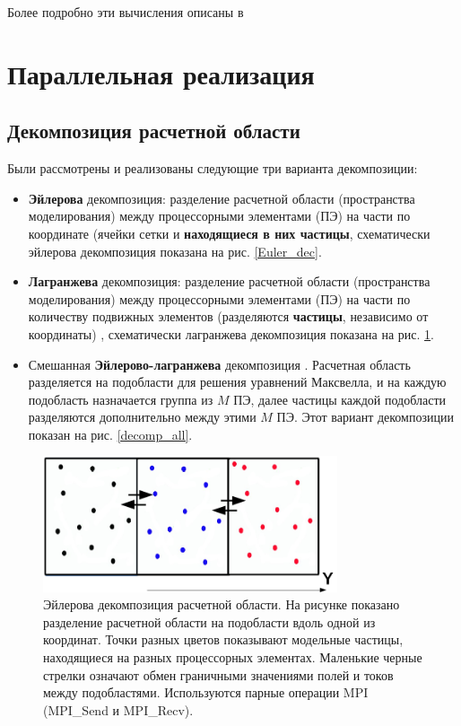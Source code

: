 Более подробно эти вычисления описаны в \cite{VychMetPlasma,MatMod,LotovPoP}


\section{ Параллельная реализация} 


\subsection{Декомпозиция расчетной области}

Были рассмотрены и реализованы следующие три варианта декомпозиции:

\begin{itemize}
\item \textbf{Эйлерова} декомпозиция: разделение расчетной области (пространства моделирования) между процессорными элементами (ПЭ) на части по координате (ячейки сетки и \textbf{находящиеся в них частицы}, схематически эйлерова декомпозиция показана на рис. \ref{Euler_dec}.

\item \textbf{Лагранжева} декомпозиция: разделение расчетной области (пространства моделирования) между процессорными элементами (ПЭ) на части по количеству подвижных элементов
(разделяются \textbf{частицы}, независимо от координаты) , схематически лагранжева декомпозиция показана на рис. \ref{Lag_dec}.

\item Смешанная \textbf{Эйлерово-лагранжева} декомпозиция \cite{VychMethProgExa}. Расчетная область разделяется на подобласти для решения уравнений Максвелла, и на каждую подобласть назначается группа из $M$ ПЭ, далее частицы каждой подобласти разделяются дополнительно между этими $M$ ПЭ. Этот вариант декомпозиции показан на рис. \ref{decomp_all}.



\end{itemize}

\begin{figure}[ht]
	\begin{center}
		\includegraphics[height=4cm,keepaspectratio]{images/decomp_Eu.png}
	\end{center}
	\caption{Эйлерова декомпозиция расчетной области. На рисунке показано разделение расчетной области на подобласти вдоль одной из координат. Точки разных цветов показывают модельные частицы, находящиеся на разных процессорных  элементах. Маленькие черные стрелки означают обмен граничными значениями полей и токов между подобластями. Используются парные операции MPI (MPI\_Send и MPI\_Recv).}
	\label{Lag_dec}
\end{figure}





